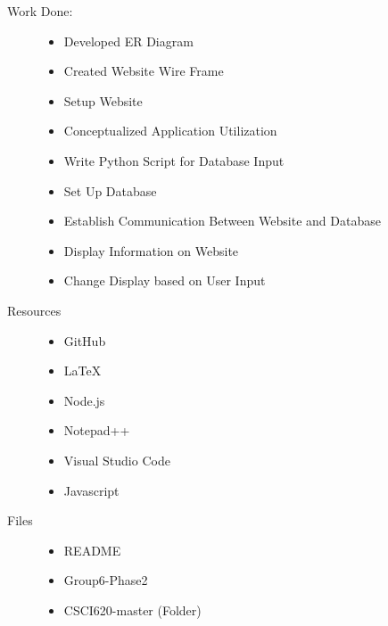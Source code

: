 \documentclass{Group6_Phase2}
\begin{document}
\begin{description}
	\item[Work Done:] \hfill
	\begin{itemize}
		\item Developed ER Diagram
		\item Created Website Wire Frame
		\item Setup Website
		\item Conceptualized Application Utilization
		\item Write Python Script for Database Input
		\item Set Up Database
		\item Establish Communication Between Website and Database
		\item Display Information on Website
		\item Change Display based on User Input
	\end{itemize}
	
	\item[Resources] \hfill
	\begin{itemize}
		\item GitHub
		\item LaTeX
		\item Node.js
		\item Notepad++
		\item Visual Studio Code
		\item Javascript
	\end{itemize}
	
	\item[Files] \hfill
	\begin{itemize}
		\item README
		\item Group6-Phase2
		\item CSCI620-master (Folder)
	\end{itemize}
\end{description}
\end{document}
